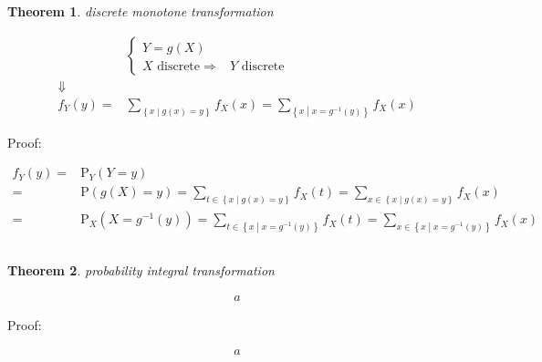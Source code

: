 \documentclass[
]{book}
\newtheorem{theorem}{Theorem}[chapter]
\theoremstyle{definition}
\theoremstyle{definition}
\theoremstyle{definition}
\theoremstyle{definition}
\theoremstyle{remark}
\begin{document}
\[
\tag*{$\Box$}
\]

\begin{theorem}
\protect\hypertarget{thm:unnamed-chunk-11}{}\label{thm:unnamed-chunk-11}discrete monotone transformation
\end{theorem}

\[
\begin{aligned}
 & \begin{cases}
Y=g\left(X\right)\\
X\text{ discrete}\Rightarrow & Y\text{ discrete}
\end{cases}\\
\Downarrow\\
f_{{\scriptscriptstyle Y}}\left(y\right)= & \sum_{\left\{ x\middle|g\left(x\right)=y\right\} }f_{{\scriptscriptstyle X}}\left(x\right)=\sum_{\left\{ x\middle|x=g^{-1}\left(y\right)\right\} }f_{{\scriptscriptstyle X}}\left(x\right)
\end{aligned}
\]

Proof:

\[
\begin{aligned}
f_{{\scriptscriptstyle Y}}\left(y\right)= & \mathrm{P}_{{\scriptscriptstyle Y}}\left(Y=y\right)\\
= & \mathrm{P}\left(g\left(X\right)=y\right)=\sum_{t\in\left\{ x\middle|g\left(x\right)=y\right\} }f_{{\scriptscriptstyle X}}\left(t\right)=\sum_{x\in\left\{ x\middle|g\left(x\right)=y\right\} }f_{{\scriptscriptstyle X}}\left(x\right)\\
= & \mathrm{P}_{{\scriptscriptstyle X}}\left(X=g^{-1}\left(y\right)\right)=\sum_{t\in\left\{ x\middle|x=g^{-1}\left(y\right)\right\} }f_{{\scriptscriptstyle X}}\left(t\right)=\sum_{x\in\left\{ x\middle|x=g^{-1}\left(y\right)\right\} }f_{{\scriptscriptstyle X}}\left(x\right)
\end{aligned}
\]

\[
\tag*{$\Box$}
\]

\begin{theorem}
\protect\hypertarget{thm:unnamed-chunk-12}{}\label{thm:unnamed-chunk-12}probability integral transformation
\end{theorem}

\[
\begin{aligned}
a
\end{aligned}
\]

Proof:

\[
\begin{aligned}
a
\end{aligned}
\]

\[
\tag*{$\Box$}
\]
\end{document}
